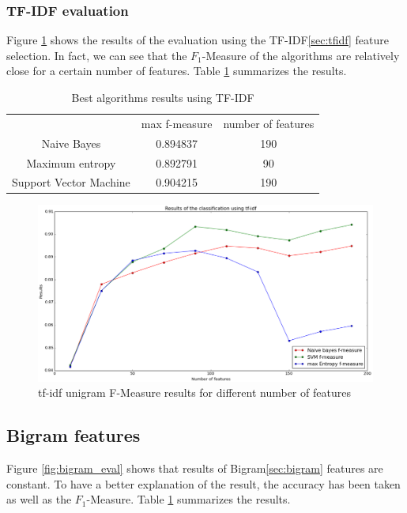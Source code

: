 \subsubsection{TF-IDF evaluation}
Figure \ref{fig:tfidf_eval} shows the results of the evaluation using the TF-IDF\ref{sec:tfidf} feature selection. In fact, we can see that the $F_1$-Measure of the algorithms are relatively close for a certain number of features. Table \ref{tab:tf-idf_results} summarizes the results.

\begin{table}[H]
\begin{tabular}{c|c|c}
		~	&				max f-measure 	& number of features \\
Naive Bayes			&		 0.894837 	&			190\\
Maximum entropy		&		 0.892791 	&			90\\
Support Vector Machine	&	 0.904215 	&			190\\
\end{tabular}
\caption{Best algorithms results using TF-IDF \label{tab:tf-idf_results}}
\end{table}

\begin{figure}[H]
  \centering
  \includegraphics[width=160mm]{figures/result_tfidf_graph.png}
  \caption{tf-idf unigram F-Measure results for different number of features \label{fig:tfidf_eval}}
\end{figure}




\subsection{Bigram features}
\label{sec:bigram_results}
Figure \ref{fig:bigram_eval} shows that results of Bigram\ref{sec:bigram} features are constant. To have a better explanation of the result, the accuracy has been taken as well as the $F_1$-Measure. Table \ref{tab:tf-idf_results} summarizes the results.

